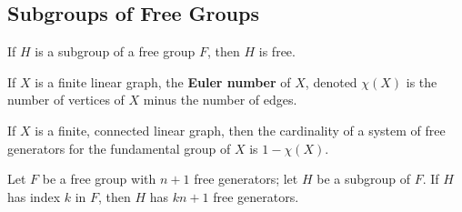 \subsection{Subgroups of Free Groups}

\begin{theorem}
If $H$ is a subgroup of a free group $F$, then $H$ is free.
\end{theorem}

\begin{definition}
If $X$ is a finite linear graph, the \textbf{Euler number} of $X$, denoted $\chi(X)$ is the number of vertices of $X$ minus the number of edges.
\end{definition}

\begin{lemma}
If $X$ is a finite, connected linear graph, then the cardinality of a system of free generators 
for the fundamental group of $X$ is $1 - \chi(X)$.
\end{lemma}

\begin{theorem}
Let $F$ be a free group with $n + 1$ free generators; let $H$ be a subgroup of $F$. If $H$ has index $k$ in $F$, then $H$
has $kn+1$ free generators.
\end{theorem}